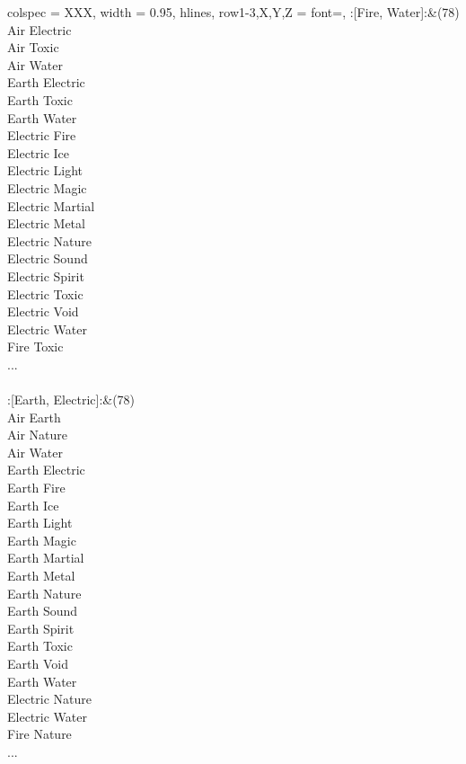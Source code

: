\begin{longtblr}[
	caption = {2v2 Defending Weak},
	label = {2v2-Defending-Weak},
]{
	colspec = {XXX}, width = 0.95\linewidth,
	hlines,
	row{1-3,X,Y,Z} = {font=\bfseries},
}
	:[Fire, Water]:&{(78)\\
	Air Electric \\
	Air Toxic \\
	Air Water \\
	Earth Electric \\
	Earth Toxic \\
	Earth Water \\
	Electric Fire \\
	Electric Ice \\
	Electric Light \\
	Electric Magic \\
	Electric Martial \\
	Electric Metal \\
	Electric Nature \\
	Electric Sound \\
	Electric Spirit \\
	Electric Toxic \\
	Electric Void \\
	Electric Water \\
	Fire Toxic \\
	...\\
	}\\

	:[Earth, Electric]:&{(78)\\
	Air Earth \\
	Air Nature \\
	Air Water \\
	Earth Electric \\
	Earth Fire \\
	Earth Ice \\
	Earth Light \\
	Earth Magic \\
	Earth Martial \\
	Earth Metal \\
	Earth Nature \\
	Earth Sound \\
	Earth Spirit \\
	Earth Toxic \\
	Earth Void \\
	Earth Water \\
	Electric Nature \\
	Electric Water \\
	Fire Nature \\
	...\\
	}\\


\end{longtblr}
